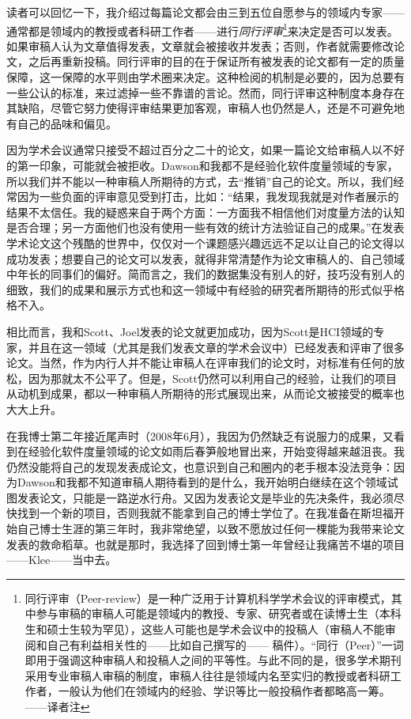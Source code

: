 \documentclass[letter,12pt]{book}
\begin{document}
\begin{CJK}{UTF8}{gbsn}
读者可以回忆一下，我介绍过每篇论文都会由三到五位自愿参与的领域内专家——通常都是领域内的教授或者科研工作者——进行\emph{同行评审}\footnote{同行评审（Peer-review）是一种广泛用于计算机科学学术会议的评审模式，其中参与审稿的审稿人可能是领域内的教授、专家、研究者或在读博士生（本科生和硕士生较为罕见），这些人可能也是学术会议中的投稿人（审稿人不能审阅和自己有利益相关性的——比如自己撰写的—— 稿件）。“同行（Peer）”一词即用于强调这种审稿人和投稿人之间的平等性。与此不同的是，很多学术期刊采用专业审稿人审稿的制度，审稿人往往是领域内名至实归的教授或者科研工作者，一般认为他们在领域内的经验、学识等比一般投稿作者都略高一筹。——译者注}来决定是否可以发表。如果审稿人认为文章值得发表，文章就会被接收并发表；否则，作者就需要修改论文，之后再重新投稿。同行评审的目的在于保证所有被发表的论文都有一定的质量保障，这一保障的水平则由学术圈来决定。这种检阅的机制是必要的，因为总要有一些公认的标准，来过滤掉一些不靠谱的言论。然而，同行评审这种制度本身存在其缺陷，尽管它努力使得评审结果更加客观，审稿人也仍然是人，还是不可避免地有自己的品味和偏见。

因为学术会议通常只接受不超过百分之二十的论文，如果一篇论文给审稿人以不好的第一印象，可能就会被拒收。Dawson和我都不是经验化软件度量领域的专家，所以我们并不能以一种审稿人所期待的方式，去“推销”自己的论文。所以，我们经常因为一些负面的评审意见受到打击，比如：“结果，我发现我就是对作者展示的结果不太信任。我的疑惑来自于两个方面：一方面我不相信他们对度量方法的认知是否合理；另一方面他们也没有使用一些有效的统计方法验证自己的成果。”在发表学术论文这个残酷的世界中，仅仅对一个课题感兴趣远远不足以让自己的论文得以成功发表；想要自己的论文可以发表，就得非常清楚作为论文审稿人的、自己领域中年长的同事们的偏好。简而言之，我们的数据集没有别人的好，技巧没有别人的细致，我们的成果和展示方式也和这一领域中有经验的研究者所期待的形式似乎格格不入。

相比而言，我和Scott、Joel发表的论文就更加成功，因为Scott是HCI领域的专家，并且在这一领域（尤其是我们发表文章的学术会议中）已经发表和评审了很多论文。当然，作为内行人并不能让审稿人在评审我们的论文时，对标准有任何的放松，因为那就太不公平了。但是，Scott仍然可以利用自己的经验，让我们的项目从动机到成果，都以一种审稿人所期待的形式展现出来，从而论文被接受的概率也大大上升。

\breakline

在我博士第二年接近尾声时（2008年6月），我因为仍然缺乏有说服力的成果，又看到在经验化软件度量领域的论文如雨后春笋般地冒出来，开始变得越来越沮丧。我仍然没能将自己的发现发表成论文，也意识到自己和圈内的老手根本没法竞争：因为Dawson和我都不知道审稿人期待看到的是什么，我开始明白继续在这个领域试图发表论文，只能是一路逆水行舟。又因为发表论文是毕业的先决条件，我必须尽快找到一个新的项目，否则我就不能拿到自己的博士学位了。在我准备在斯坦福开始自己博士生涯的第三年时，我非常绝望，以致不愿放过任何一棵能为我带来论文发表的救命稻草。也就是那时，我选择了回到博士第一年曾经让我痛苦不堪的项目——Klee——当中去。


\end{CJK}
\end{document}

